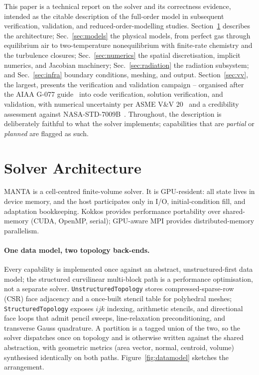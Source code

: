 \documentclass[journal,biblatex]{new-aiaa}
\begin{document}
This paper is a technical report on the solver and its correctness evidence, intended as the citable description of the full-order model in subsequent verification, validation, and reduced-order-modelling studies. Section~\ref{sec:arch} describes the architecture; Sec.~\ref{sec:models} the physical models, from perfect gas through equilibrium air to two-temperature nonequilibrium with finite-rate chemistry and the turbulence closures; Sec.~\ref{sec:numerics} the spatial discretisation, implicit numerics, and Jacobian machinery; Sec.~\ref{sec:radiation} the radiation subsystem; and Sec.~\ref{sec:infra} boundary conditions, meshing, and output. Section~\ref{sec:vv}, the largest, presents the verification and validation campaign -- organised after the AIAA G-077 guide~\cite{noauthor_guide_1998} into code verification, solution verification, and validation, with numerical uncertainty per ASME V\&V 20~\cite{noauthor_standard_nodate} and a credibility assessment against NASA-STD-7009B~\cite{noauthor_nasa_nodate}. Throughout, the description is deliberately faithful to what the solver implements; capabilities that are \emph{partial} or \emph{planned} are flagged as such.

\section{Solver Architecture}
\label{sec:arch}

MANTA is a cell-centred finite-volume solver. It is GPU-resident: all state lives in device memory, and the host participates only in I/O, initial-condition fill, and adaptation bookkeeping. Kokkos provides performance portability over shared-memory (CUDA, OpenMP, serial); GPU-aware MPI provides distributed-memory parallelism.

\paragraph{One data model, two topology back-ends.}
Every capability is implemented once against an abstract, unstructured-first data model; the structured curvilinear multi-block path is a performance optimisation, not a separate solver. \texttt{UnstructuredTopology} stores compressed-sparse-row (CSR) face adjacency and a once-built stencil table for polyhedral meshes; \texttt{StructuredTopology} exposes $ijk$ indexing, arithmetic stencils, and directional face loops that admit pencil sweeps, line-relaxation preconditioning, and transverse Gauss quadrature. A partition is a tagged union of the two, so the solver dispatches once on topology and is otherwise written against the shared abstraction, with geometric metrics (area vector, normal, centroid, volume) synthesised identically on both paths. Figure~\ref{fig:datamodel} sketches the arrangement.
\end{document}
